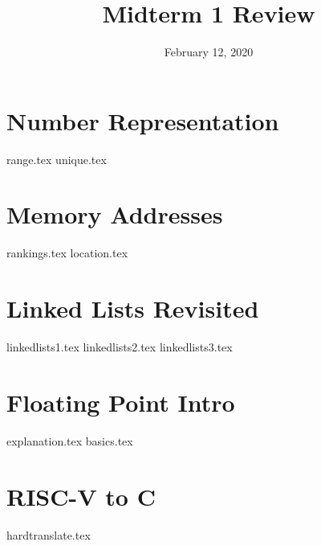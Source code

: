 \documentclass[11pt]{exam}
\title{Midterm 1 Review}
\date{February 12, 2020}
\begin{document}
\maketitle

\section{Number Representation}
\begin{questions}
{range.tex}
{unique.tex}
\end{questions}
\newpage

\section{Memory Addresses}
\begin{questions}
{rankings.tex}
{location.tex}
\end{questions}

\section{Linked Lists Revisited}
\begin{questions}
{linkedlists1.tex}
{linkedlists2.tex}
{linkedlists3.tex}
\end{questions}
\newpage

\section{Floating Point Intro}
\begin{questions}
{explanation.tex}
{basics.tex}
\end{questions}
\newpage

\section{RISC-V to C}
\begin{questions}
{hardtranslate.tex}
\end{questions}
\newpage
\end{document}
